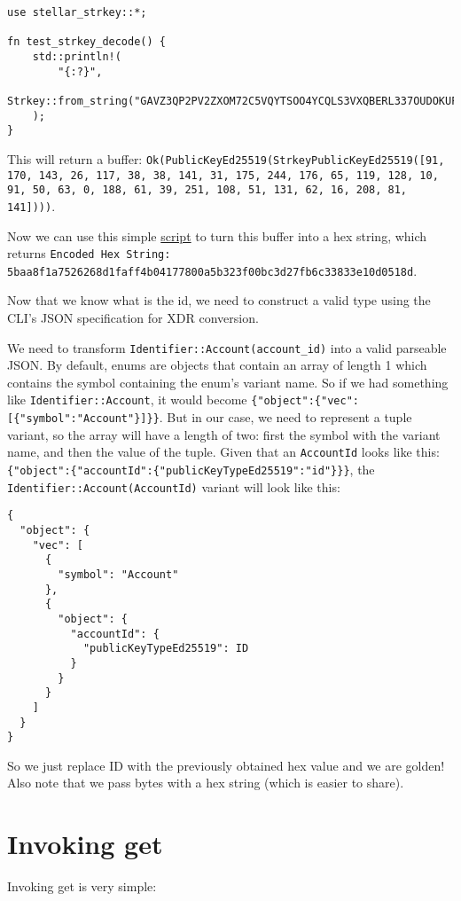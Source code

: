 \documentclass[10pt]{article}
\begin{document}
\begin{verbatim}
use stellar_strkey::*;

fn test_strkey_decode() {
	std::println!(
        "{:?}",
        Strkey::from_string("GAVZ3QP2PV2ZXOM72C5VQYTSOO4YCQLS3VXQBERL337OUDOKUFMUFOVR")
    );
}
\end{verbatim}

This will return a buffer: \texttt{Ok(PublicKeyEd25519(StrkeyPublicKeyEd25519([91, 170, 143, 26, 117, 38, 38, 141, 31, 175, 244, 176, 65, 119, 128, 10, 91, 50, 63, 0, 188, 61, 39, 251, 108, 51, 131, 62, 16, 208, 81, 141])))}.

Now we can use this simple \href{https://go.dev/play/p/z3yJPp72K8B}{script} to turn this buffer into a hex string, which returns \texttt{Encoded Hex String: 5baa8f1a7526268d1faff4b04177800a5b323f00bc3d27fb6c33833e10d0518d}.

Now that we know what is the id, we need to construct a valid type using the CLI's JSON specification for XDR conversion.

We need to transform \texttt{Identifier::Account(account\_id)} into a valid parseable JSON. By default, enums are objects that contain an array of length 1 which contains the symbol containing the enum's variant name. So if we had something like \texttt{Identifier::Account}, it would become \texttt{\{"object":\{"vec":[\{"symbol":"Account"\}]\}\}}. But in our case, we need to represent a tuple variant, so the array will have a length of two: first the symbol with the variant name, and then the value of the tuple. Given that an \texttt{AccountId} looks like this: \texttt{\{"object":\{"accountId":\{"publicKeyTypeEd25519":"id"\}\}\}}, the \texttt{Identifier::Account(AccountId)} variant will look like this:

\begin{verbatim}
{
  "object": {
    "vec": [
      {
        "symbol": "Account"
      },
      {
        "object": {
          "accountId": {
            "publicKeyTypeEd25519": ID
          }
        }
      }
    ]
  }
}
\end{verbatim}

So we just replace ID with the previously obtained hex value and we are golden! Also note that we pass bytes with a hex string (which is easier to share).

\section*{Invoking get}
Invoking get is very simple:
\end{document}
